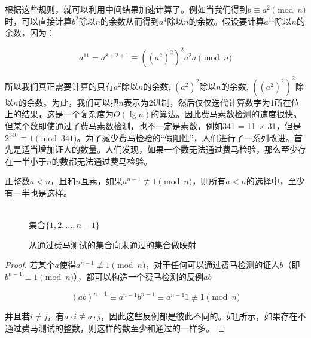 \documentclass[b5paper]{ctexart}
\begin{document}
根据这些规则，就可以利用中间结果加速计算了。例如当我们得到$b \equiv a^2 \pmod{n}$时，可以直接计算$b^2$除以$n$的余数从而得到$a^4$除以$n$的余数。假设要计算$a^{11}$除以$n$的余数，因为：

\[
a^{11} = a^{8 + 2 + 1} \equiv ((a^2)^2)^2a^2a \pmod{n}
\]

所以我们真正需要计算的只有$a^2$除以$n$的余数, $(a^2)^2$除以$n$的余数, $((a^2)^2)^2$除以$n$的余数。为此，我们可以把$n$表示为2进制，然后仅仅迭代计算数字为1所在位上的结果，这是一个复杂度为$O(\lg n)$的算法。因此费马素数检测的速度很快。但某个数即使通过了费马素数检测，也不一定是素数，例如341 = 11 $\times$ 31，但是$2^{340} \equiv 1 \pmod{341}$。为了减少费马检验的“假阳性”，人们进行了一系列改进。首先是适当增加证人的数量。人们发现，如果一个数无法通过费马检验，那么至少存在一半小于$n$的数都无法通过费马检验。

\begin{proposition}
正整数$a<n$，且和$n$互素，如果$a^{n-1} \not\equiv 1 \pmod n$，则所有$a<n$的选择中，至少有一半也是这样。
\end{proposition}

\begin{figure}[htbp]
\centering
{} \\
集合$\{1, 2, ..., n-1\}$
\caption{从通过费马测试的集合向未通过的集合做映射}
\label{fig:Fermat-test}
\end{figure}

\begin{proof}
若某个$a$使得$a^{n-1} \not\equiv 1 \pmod n$，对于任何可以通过费马检测的证人$b$（即$b^{n-1} \equiv 1 \pmod n$），都可以构造一个费马检测的反例$ab$

\[
(ab)^{n-1} \equiv a^{n-1}b^{n-1} \equiv a^{n-1}1 \not\equiv 1 \pmod n
\]

并且若$i \neq j$，有$a \cdot i \not\equiv a \cdot j$，因此这些反例都是彼此不同的。如\cref{fig:Fermat-test}所示，如果存在不通过费马测试的整数，则这样的数至少和通过的一样多。
\end{proof}
\end{document}

